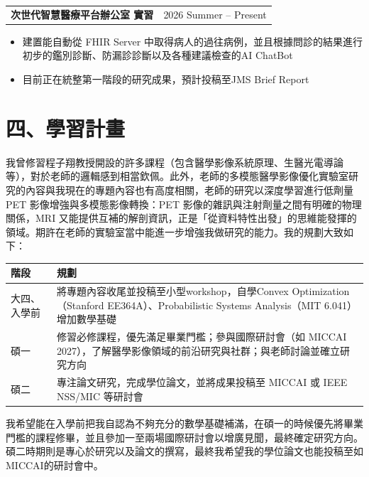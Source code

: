 \documentclass[11pt]{article}
\makeatletter
\newcommand{\entry}[2]{%
  \par\noindent
  \begin{tabularx}{\textwidth}{@{}X r@{}}
    \textbf{#1} & #2
  \end{tabularx}\par}
\makeatother
\begin{document}
\entry{次世代智慧醫療平台辦公室 實習}{2026 Summer -- Present}
\begin{itemize}
  \item 建置能自動從 FHIR Server 中取得病人的過往病例，並且根據問診的結果進行初步的鑑別診斷、防漏診診斷以及各種建議檢查的AI ChatBot
  \item 目前正在統整第一階段的研究成果，預計投稿至JMS Brief Report
\end{itemize}

\section*{四、學習計畫}
我曾修習程子翔教授開設的許多課程（包含醫學影像系統原理、生醫光電導論等），對於老師的邏輯感到相當欽佩。此外，老師的多模態醫學影像優化實驗室研究的內容與我現在的專題內容也有高度相關，老師的研究以深度學習進行低劑量 PET 影像增強與多模態影像轉換：PET 影像的雜訊與注射劑量之間有明確的物理關係，MRI 又能提供互補的解剖資訊，正是「從資料特性出發」的思維能發揮的領域。期許在老師的實驗室當中能進一步增強我做研究的能力。我的規劃大致如下：

\vspace{4pt}
\noindent
\begin{tabularx}{\textwidth}{@{}l X@{}}
\toprule
\textbf{階段} & \textbf{規劃} \\
\midrule
大四、入學前 & 將專題內容收尾並投稿至小型workshop，自學Convex Optimization（Stanford EE364A）、Probabilistic Systems Analysis（MIT 6.041）增加數學基礎\\
碩一 & 修習必修課程，優先滿足畢業門檻；參與國際研討會（如 MICCAI 2027），了解醫學影像領域的前沿研究與社群；與老師討論並確立研究方向\\
碩二 & 專注論文研究，完成學位論文，並將成果投稿至 MICCAI 或 IEEE NSS/MIC 等研討會 \\
\bottomrule
\end{tabularx}

我希望能在入學前把我自認為不夠充分的數學基礎補滿，在碩一的時候優先將畢業門檻的課程修畢，並且參加一至兩場國際研討會以增廣見聞，最終確定研究方向。碩二時期則是專心於研究以及論文的撰寫，最終我希望我的學位論文也能投稿至如MICCAI的研討會中。
\end{document}

